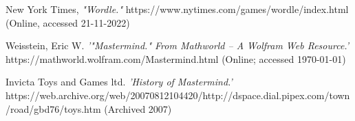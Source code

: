\documentclass[11pt]{article}  %
\theoremstyle{definition}
\theoremstyle{remark}
\begin{document}
%
%
%
\begin{thebibliography}{99}

% 
%



%

%




New York Times,
{\em "Wordle."}
https://www.nytimes.com/games/wordle/index.html
(Online, accessed 21-11-2022)

Weisstein, Eric W.
{\em '"Mastermind." From Mathworld -- A Wolfram Web Resource.'}
https://mathworld.wolfram.com/Mastermind.html
(Online; accessed \today)

Invicta Toys and Games ltd.
{\em 'History of Mastermind.'}
https://web.archive.org/web/20070812104420/http://dspace.dial.pipex.com/town/road/gbd76/toys.htm
(Archived 2007)


\end{thebibliography}
\end{document}
